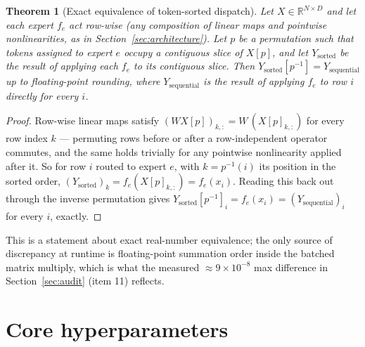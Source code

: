 \documentclass[11pt,letterpaper]{article}
\newtheorem{theorem}{Theorem}
\begin{document}
\begin{theorem}[Exact equivalence of token-sorted dispatch]
\label{thm:dispatch}
Let $X \in \mathbb{R}^{N\times D}$ and let each expert $f_e$ act row-wise (any composition of linear maps and pointwise nonlinearities, as in Section~\ref{sec:architecture}). Let $p$ be a permutation such that tokens assigned to expert $e$ occupy a contiguous slice of $X[p]$, and let $Y_{\text{sorted}}$ be the result of applying each $f_e$ to its contiguous slice. Then $Y_{\text{sorted}}[p^{-1}] = Y_{\text{sequential}}$ up to floating-point rounding, where $Y_{\text{sequential}}$ is the result of applying $f_e$ to row $i$ directly for every $i$.
\end{theorem}
\begin{proof}
Row-wise linear maps satisfy $(W X[p])_{k,:} = W\,(X[p]_{k,:})$ for every row index $k$ --- permuting rows before or after a row-independent operator commutes, and the same holds trivially for any pointwise nonlinearity applied after it. So for row $i$ routed to expert $e$, with $k = p^{-1}(i)$ its position in the sorted order, $(Y_{\text{sorted}})_k = f_e(X[p]_{k,:}) = f_e(x_i)$. Reading this back out through the inverse permutation gives $Y_{\text{sorted}}[p^{-1}]_i = f_e(x_i) = (Y_{\text{sequential}})_i$ for every $i$, exactly. \qedhere
\end{proof}
\noindent This is a statement about exact real-number equivalence; the only source of discrepancy at runtime is floating-point summation order inside the batched matrix multiply, which is what the measured $\approx 9\times 10^{-8}$ max difference in Section~\ref{sec:audit} (item 11) reflects.

\section{Core hyperparameters}
\end{document}
